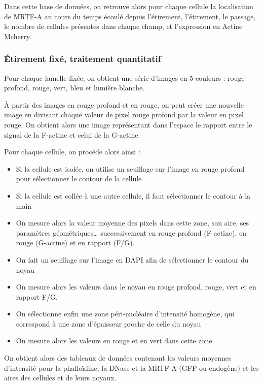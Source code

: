 	Dans cette base de données, on retrouve alors pour chaque cellule la localisation de MRTF-A au cours du temps écoulé depuis l'étirement, l'étirement, le passage, le nombre de cellules présentes dans chaque champ, et l'expression en Actine Mcherry.
	\subsubsection{\'Etirement fixé, traitement quantitatif}	
	
	Pour chaque lamelle fixée, on obtient une série d'images en 5 couleurs : rouge profond, rouge, vert, bleu et lumière blanche. 

À partir des images en rouge profond et en rouge, on peut créer une nouvelle image en divisant chaque valeur de pixel rouge profond par la valeur en pixel rouge. On obtient alors une image représentant dans l'espace le rapport entre le signal de la F-actine et celui de la G-actine.

Pour chaque cellule, on procède alors ainsi : 
\begin{itemize}
\item Si la cellule est isolée, on utilise un seuillage sur l'image en rouge profond pour sélectionner le contour de la cellule
\item Si la cellule est collée à une autre cellule, il faut sélectionner le contour à la main
\item On mesure alors la valeur moyenne des pixels dans cette zone, son aire, ses paramètres géométriques\dots
successivement en rouge profond (F-actine), en rouge (G-actine) et en rapport (F/G). 
\item On fait un seuillage sur l'image en DAPI afin de sélectionner le contour du noyau
\item On mesure alors les valeurs dans le noyau en rouge profond, rouge, vert et en rapport F/G. 
\item On sélectionne enfin une zone péri-nucléaire d'intensité homogène, qui correspond à une zone d'épaisseur proche de celle du noyau
\item On mesure alors les valeurs en rouge et en vert dans cette zone
\end{itemize}	
	
	On obtient alors des tableaux de données contenant les valeurs moyennes d'intensité pour la phalloïdine, la DNase et la MRTF-A (GFP ou endogène) et les aires des cellules et de leurs noyaux. 
	
	
%